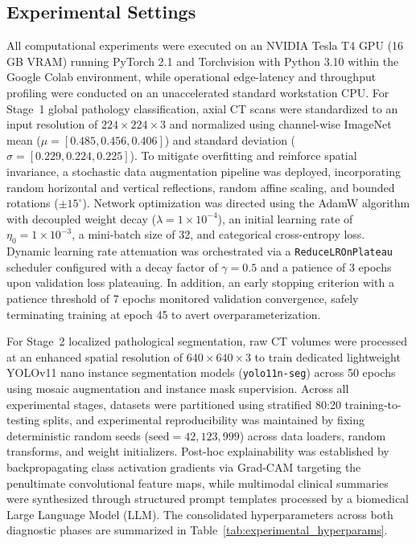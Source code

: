 \documentclass[]{elsarticle}
\begin{document}
\subsection{Experimental Settings}
\label{subsec:experimental_settings}

All computational experiments were executed on an NVIDIA Tesla T4 GPU (16\,GB VRAM) running PyTorch 2.1 and Torchvision with Python 3.10 within the Google Colab environment, while operational edge-latency and throughput profiling were conducted on an unaccelerated standard workstation CPU. For Stage~1 global pathology classification, axial CT scans were standardized to an input resolution of $224 \times 224 \times 3$ and normalized using channel-wise ImageNet mean ($\mu = [0.485, 0.456, 0.406]$) and standard deviation ($\sigma = [0.229, 0.224, 0.225]$). To mitigate overfitting and reinforce spatial invariance, a stochastic data augmentation pipeline was deployed, incorporating random horizontal and vertical reflections, random affine scaling, and bounded rotations ($\pm 15^\circ$). Network optimization was directed using the AdamW algorithm with decoupled weight decay ($\lambda = 1 \times 10^{-4}$), an initial learning rate of $\eta_0 = 1 \times 10^{-3}$, a mini-batch size of 32, and categorical cross-entropy loss. Dynamic learning rate attenuation was orchestrated via a \texttt{ReduceLROnPlateau} scheduler configured with a decay factor of $\gamma = 0.5$ and a patience of 3 epochs upon validation loss plateauing. In addition, an early stopping criterion with a patience threshold of 7 epochs monitored validation convergence, safely terminating training at epoch 45 to avert overparameterization.

For Stage~2 localized pathological segmentation, raw CT volumes were processed at an enhanced spatial resolution of $640 \times 640 \times 3$ to train dedicated lightweight YOLOv11 nano instance segmentation models (\texttt{yolo11n-seg}) across 50 epochs using mosaic augmentation and instance mask supervision. Across all experimental stages, datasets were partitioned using stratified 80:20 training-to-testing splits, and experimental reproducibility was maintained by fixing deterministic random seeds ($\text{seed} = 42, 123, 999$) across data loaders, random transforms, and weight initializers. Post-hoc explainability was established by backpropagating class activation gradients via Grad-CAM targeting the penultimate convolutional feature maps, while multimodal clinical summaries were synthesized through structured prompt templates processed by a biomedical Large Language Model (LLM). The consolidated hyperparameters across both diagnostic phases are summarized in Table~\ref{tab:experimental_hyperparams}.
\end{document}
